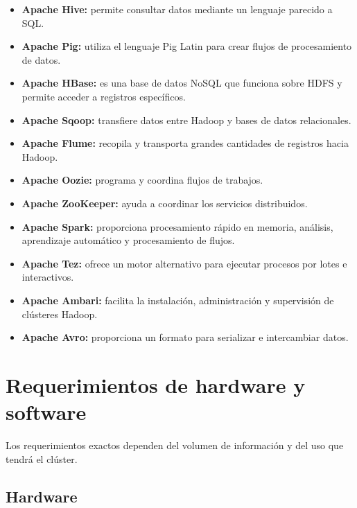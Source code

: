 \begin{itemize}
    \item \textbf{Apache Hive:} permite consultar datos mediante un lenguaje
    parecido a SQL.

    \item \textbf{Apache Pig:} utiliza el lenguaje Pig Latin para crear flujos
    de procesamiento de datos.

    \item \textbf{Apache HBase:} es una base de datos NoSQL que funciona sobre
    HDFS y permite acceder a registros específicos.

    \item \textbf{Apache Sqoop:} transfiere datos entre Hadoop y bases de datos
    relacionales.

    \item \textbf{Apache Flume:} recopila y transporta grandes cantidades de
    registros hacia Hadoop.

    \item \textbf{Apache Oozie:} programa y coordina flujos de trabajos.

    \item \textbf{Apache ZooKeeper:} ayuda a coordinar los servicios
    distribuidos.

    \item \textbf{Apache Spark:} proporciona procesamiento rápido en memoria,
    análisis, aprendizaje automático y procesamiento de flujos.

    \item \textbf{Apache Tez:} ofrece un motor alternativo para ejecutar
    procesos por lotes e interactivos.

    \item \textbf{Apache Ambari:} facilita la instalación, administración y
    supervisión de clústeres Hadoop.

    \item \textbf{Apache Avro:} proporciona un formato para serializar e
    intercambiar datos.
\end{itemize}

\section{Requerimientos de hardware y software}

Los requerimientos exactos dependen del volumen de información y del uso que
tendrá el clúster.

\subsection{Hardware}

